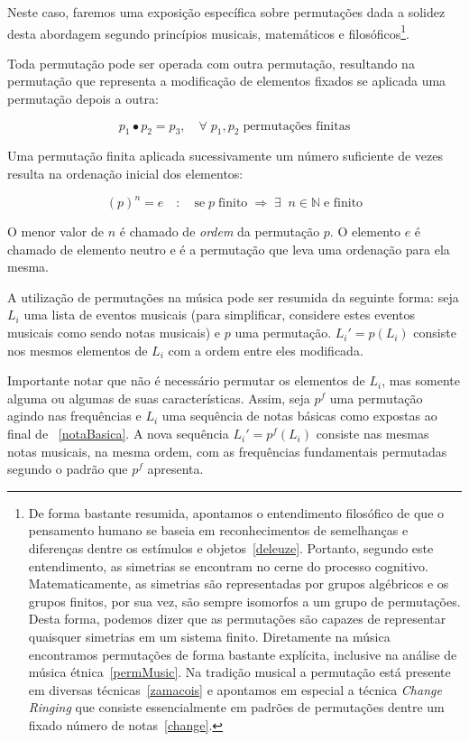 Neste caso, faremos uma exposição específica sobre permutações dada
a solidez desta abordagem segundo princípios musicais, matemáticos e
filosóficos\footnote{De forma bastante resumida, apontamos o
entendimento filosófico de que o pensamento humano se baseia
em reconhecimentos de semelhanças e diferenças dentre os estímulos
e objetos~\ref{deleuze}. Portanto, segundo este entendimento,
as simetrias se encontram no cerne do processo cognitivo. Matematicamente,
as simetrias são representadas por grupos algébricos e os grupos finitos, por sua vez,
são sempre isomorfos a um grupo de permutações. Desta forma, podemos dizer que
as permutações são capazes de representar quaisquer simetrias em um sistema finito.
Diretamente na música encontramos permutações de forma bastante explícita, inclusive
na análise de música étnica~\ref{permMusic}.
Na tradição musical a permutação está presente em diversas técnicas~\ref{zamacois} e
apontamos em especial a técnica \emph{Change Ringing} que consiste essencialmente
em padrões de permutações dentre um fixado número de notas~\ref{change}.}.

Toda permutação pode ser operada com outra permutação, resultando na permutação
que representa a modificação de elementos fixados se aplicada uma permutação
depois a outra:

\begin{equation}
p_1 \bullet p_2 = p_3, \quad \forall \; p_1, p_2 \; \text{permutações finitas}
\end{equation}

Uma permutação finita aplicada sucessivamente um número suficiente de vezes
resulta na ordenação inicial dos elementos:

\begin{equation}
(p)^n = e \quad : \quad \text{se} \; p \; \text{finito} \; \Rightarrow \; \exists \;\; n  \in \mathbb{N} \; \text{e finito}
\end{equation}

O menor valor de $n$ é chamado de \emph{ordem} da permutação $p$. O elemento $e$ é chamado de elemento neutro e é
a permutação que leva uma ordenação para ela mesma.

A utilização de permutações na música pode ser resumida da seguinte forma:
seja $L_i$ uma lista de eventos musicais (para simplificar, considere
estes eventos musicais como sendo notas musicais) e $p$ uma permutação.
$L_i'=p(L_i)$ consiste nos mesmos elementos de $L_i$ com a ordem entre eles
modificada.

Importante notar que não é necessário permutar os elementos de $L_i$, mas somente
alguma ou algumas de suas características. Assim, seja $p^f$ uma permutação agindo
nas frequências e $L_i$ uma sequência de notas básicas como expostas
ao final de ~\ref{notaBasica}. A nova sequência $L_i'=p^f(L_i)$ consiste nas mesmas
notas musicais, na mesma ordem, com as frequências fundamentais permutadas segundo
o padrão que $p^f$ apresenta.

